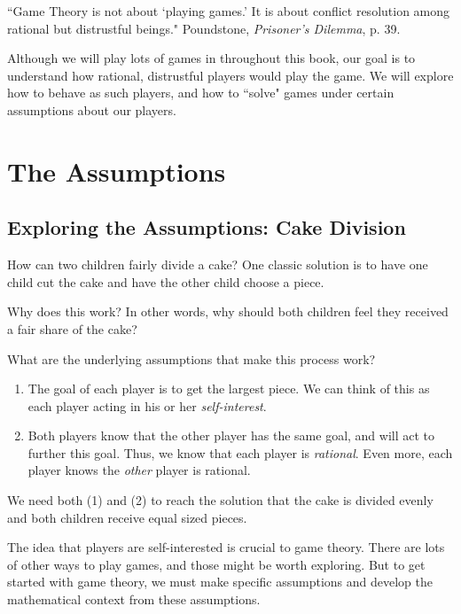\vspace{.2in}
``Game Theory is not about `playing games.' It is about conflict resolution among rational but distrustful beings." Poundstone, {\it Prisoner's Dilemma}, p. 39.

Although we will play lots of games in throughout this book, our goal is to understand how rational, distrustful players would play the game. We will explore how to behave as such players, and how to ``solve" games under certain assumptions about our players.

\vspace{.1in}

\section{The Assumptions}

\subsection{Exploring the Assumptions: Cake Division}



How can two children fairly divide a cake? One classic solution is to have one child cut the cake and have the other child choose a piece.

Why does this work? In other words, why should both children feel they received a fair share of the cake?

What are the underlying assumptions that make this process work?
\begin{enumerate}
\item The goal of each player is to get the largest piece. We can think of this as each player acting in his or her {\it self-interest}.
\item Both players know that the other player has the same goal, and will act to further this goal. Thus, we know that each player is {\it rational}. Even more, each player knows the {\it other} player is rational.
\end{enumerate}

We need both (1) and (2) to reach the solution that the cake is divided evenly and both children receive equal sized pieces.

The idea that players are self-interested is crucial to game theory. There are lots of other ways to play games, and those might be worth exploring. But to get started with game theory, we must make specific assumptions and develop the mathematical context from these assumptions. 

